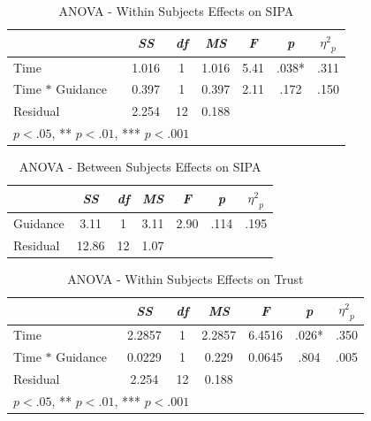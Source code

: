 \documentclass[11pt,a4paper,english]{scrreprt}
\begin{document}
\begin{table}[htbp]
    \centering
    \begin{tabularx}{0.7\textwidth}{ l c c c c c c }
        \toprule
        & \textit{SS} & \textit{df} & \textit{MS} & \textit{F} & \textit{p} & ${\eta^2}_p$ \\
        \midrule
        Time & 1.016 & 1 & 1.016 & 5.41 & .038* & .311 \\
        Time $\ast$ Guidance & 0.397 & 1 & 0.397 & 2.11 & .172 & .150 \\
        Residual & 2.254 & 12 & 0.188 & & & \\
        \bottomrule
        \multicolumn{3}{l}{\footnotesize * $\textit{p}<.05$, ** $\textit{p}<.01$, *** $\textit{p}<.001$} \\
    \end{tabularx}
    \caption{ANOVA - Within Subjects Effects on SIPA}
    \label{table:anova_within_sipa}
\end{table}

\begin{table}[htbp]
    \centering
    \begin{tabularx}{0.6\textwidth}{ l c c c c c c }
        \toprule
        & \textit{SS} & \textit{df} & \textit{MS} & \textit{F} & \textit{p} & ${\eta^2}_p$ \\
        \midrule
        Guidance & 3.11 & 1 & 3.11 & 2.90 & .114 & .195 \\
        Residual & 12.86 & 12 & 1.07 & & & \\
        \bottomrule
    \end{tabularx}
    \caption{ANOVA - Between Subjects Effects on SIPA}
    \label{table:anova_between_sipa}
\end{table}

\begin{table}[htbp]
    \centering
    \begin{tabularx}{0.75\textwidth}{ l c c c c c c }
        \toprule
        & \textit{SS} & \textit{df} & \textit{MS} & \textit{F} & \textit{p} & ${\eta^2}_p$ \\
        \midrule
        Time & 2.2857 & 1 & 2.2857 & 6.4516 & .026* & .350 \\
        Time $\ast$ Guidance & 0.0229 & 1 & 0.229 & 0.0645 & .804 & .005 \\
        Residual & 2.254 & 12 & 0.188 & & & \\
        \bottomrule
        \multicolumn{3}{l}{\footnotesize * $\textit{p}<.05$, ** $\textit{p}<.01$, *** $\textit{p}<.001$} \\
    \end{tabularx}
    \caption{ANOVA - Within Subjects Effects on Trust}
    \label{table:anova_within_trust}
\end{table}
\end{document}
